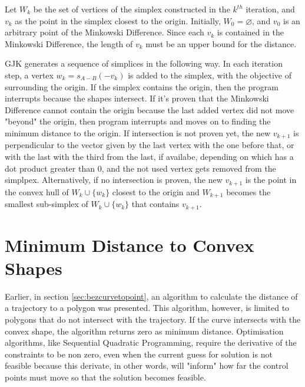 \par Let $W_k$ be the set of vertices of the simplex constructed in the $k^{th}$ iteration, and $v_k$ as the point in the simplex closest to the origin. Initially, $W_0=\varnothing$, and $v_0$ is an arbitrary point of the Minkowski Difference. Since each $v_k$ is contained in the Minkowski Difference, the length of $v_k$ must be an upper bound for the distance.
\par \ac{GJK} generates a sequence of simplices in the following way. In each iteration step, a vertex $w_k = s_{A-B}(-v_k)$ is added to the simplex, with the objective of surrounding the origin. If the simplex contains the origin, then the program interrupts because the shapes intersect. If it's proven that the Minkowski Difference cannot contain the origin because the last added vertex did not move "beyond" the origin, then program interrupts and moves on to finding the minimum distance to the origin. If intersection is not proven yet, the new $v_{k+1}$ is perpendicular to the vector given by the last vertex with the one before that, or with the last with the third from the last, if availabe, depending on which has a dot product greater than 0, and the not used vertex gets removed from the simplpex. Alternatively, if no intersection is proven, the new $v_{k+1}$ is the point in the convex hull of $W_k\cup \{w_k\}$ closest to the origin and $W_{k+1}$ becomes the smallest sub-simplex of $W_k\cup \{w_k\}$ that contains $v_{k+1}$.


\section{Minimum Distance to Convex Shapes}
\label{sev:mindistconvshapes}

\par Earlier, in section \ref{sec:bezcurvetopoint}, an algorithm to calculate the distance of a trajectory to a polygon was presented. This algorithm, however, is limited to polygons that do not intersect with the trajectory. If the curve intersects with the convex shape, the algorithm returns zero as minimum distance. Optimisation algorithms, like Sequential Quadratic Programming, require the derivative of the constraints to be non zero, even when the current guess for solution is not feasible because this derivate, in other words, will "inform" how far the control points must move so that the solution becomes feasible.

